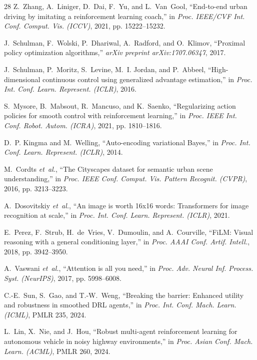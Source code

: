 \documentclass[conference]{IEEEtran}
\begin{document}
\begin{thebibliography}{28}
Z.~Zhang, A.~Liniger, D.~Dai, F.~Yu, and L.~Van~Gool, ``End-to-end urban driving by imitating a reinforcement learning coach,'' in \emph{Proc. IEEE/CVF Int. Conf. Comput. Vis. (ICCV)}, 2021, pp. 15222--15232.

J.~Schulman, F.~Wolski, P.~Dhariwal, A.~Radford, and O.~Klimov, ``Proximal policy optimization algorithms,'' \emph{arXiv preprint arXiv:1707.06347}, 2017.

J.~Schulman, P.~Moritz, S.~Levine, M.~I. Jordan, and P.~Abbeel, ``High-dimensional continuous control using generalized advantage estimation,'' in \emph{Proc. Int. Conf. Learn. Represent. (ICLR)}, 2016.

S.~Mysore, B.~Mabsout, R.~Mancuso, and K.~Saenko, ``Regularizing action policies for smooth control with reinforcement learning,'' in \emph{Proc. IEEE Int. Conf. Robot. Autom. (ICRA)}, 2021, pp. 1810--1816.

D.~P. Kingma and M.~Welling, ``Auto-encoding variational Bayes,'' in \emph{Proc. Int. Conf. Learn. Represent. (ICLR)}, 2014.

M.~Cordts \emph{et~al.}, ``The Cityscapes dataset for semantic urban scene understanding,'' in \emph{Proc. IEEE Conf. Comput. Vis. Pattern Recognit. (CVPR)}, 2016, pp. 3213--3223.

A.~Dosovitskiy \emph{et~al.}, ``An image is worth 16x16 words: Transformers for image recognition at scale,'' in \emph{Proc. Int. Conf. Learn. Represent. (ICLR)}, 2021.

E.~Perez, F.~Strub, H.~de~Vries, V.~Dumoulin, and A.~Courville, ``FiLM: Visual reasoning with a general conditioning layer,'' in \emph{Proc. AAAI Conf. Artif. Intell.}, 2018, pp. 3942--3950.

A.~Vaswani \emph{et~al.}, ``Attention is all you need,'' in \emph{Proc. Adv. Neural Inf. Process. Syst. (NeurIPS)}, 2017, pp. 5998--6008.

C.-E.~Sun, S.~Gao, and T.-W.~Weng, ``Breaking the barrier: Enhanced utility and robustness in smoothed DRL agents,'' in \emph{Proc. Int. Conf. Mach. Learn. (ICML)}, PMLR 235, 2024.

L.~Lin, X.~Nie, and J.~Hou, ``Robust multi-agent reinforcement learning for autonomous vehicle in noisy highway environments,'' in \emph{Proc. Asian Conf. Mach. Learn. (ACML)}, PMLR 260, 2024.


\end{thebibliography}
\end{document}
